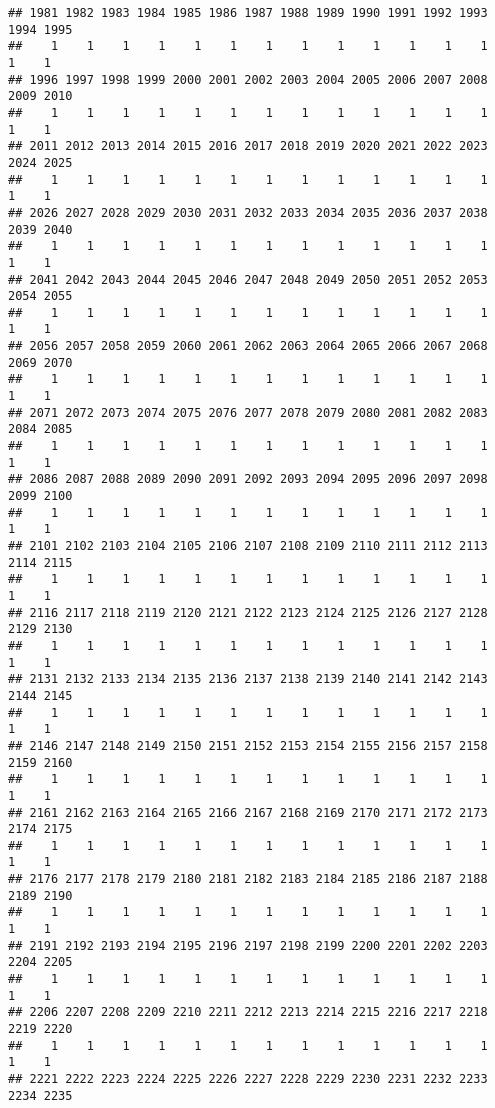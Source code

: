 \documentclass[]{article}
\begin{document}
\begin{verbatim}
## 1981 1982 1983 1984 1985 1986 1987 1988 1989 1990 1991 1992 1993 1994 1995 
##    1    1    1    1    1    1    1    1    1    1    1    1    1    1    1 
## 1996 1997 1998 1999 2000 2001 2002 2003 2004 2005 2006 2007 2008 2009 2010 
##    1    1    1    1    1    1    1    1    1    1    1    1    1    1    1 
## 2011 2012 2013 2014 2015 2016 2017 2018 2019 2020 2021 2022 2023 2024 2025 
##    1    1    1    1    1    1    1    1    1    1    1    1    1    1    1 
## 2026 2027 2028 2029 2030 2031 2032 2033 2034 2035 2036 2037 2038 2039 2040 
##    1    1    1    1    1    1    1    1    1    1    1    1    1    1    1 
## 2041 2042 2043 2044 2045 2046 2047 2048 2049 2050 2051 2052 2053 2054 2055 
##    1    1    1    1    1    1    1    1    1    1    1    1    1    1    1 
## 2056 2057 2058 2059 2060 2061 2062 2063 2064 2065 2066 2067 2068 2069 2070 
##    1    1    1    1    1    1    1    1    1    1    1    1    1    1    1 
## 2071 2072 2073 2074 2075 2076 2077 2078 2079 2080 2081 2082 2083 2084 2085 
##    1    1    1    1    1    1    1    1    1    1    1    1    1    1    1 
## 2086 2087 2088 2089 2090 2091 2092 2093 2094 2095 2096 2097 2098 2099 2100 
##    1    1    1    1    1    1    1    1    1    1    1    1    1    1    1 
## 2101 2102 2103 2104 2105 2106 2107 2108 2109 2110 2111 2112 2113 2114 2115 
##    1    1    1    1    1    1    1    1    1    1    1    1    1    1    1 
## 2116 2117 2118 2119 2120 2121 2122 2123 2124 2125 2126 2127 2128 2129 2130 
##    1    1    1    1    1    1    1    1    1    1    1    1    1    1    1 
## 2131 2132 2133 2134 2135 2136 2137 2138 2139 2140 2141 2142 2143 2144 2145 
##    1    1    1    1    1    1    1    1    1    1    1    1    1    1    1 
## 2146 2147 2148 2149 2150 2151 2152 2153 2154 2155 2156 2157 2158 2159 2160 
##    1    1    1    1    1    1    1    1    1    1    1    1    1    1    1 
## 2161 2162 2163 2164 2165 2166 2167 2168 2169 2170 2171 2172 2173 2174 2175 
##    1    1    1    1    1    1    1    1    1    1    1    1    1    1    1 
## 2176 2177 2178 2179 2180 2181 2182 2183 2184 2185 2186 2187 2188 2189 2190 
##    1    1    1    1    1    1    1    1    1    1    1    1    1    1    1 
## 2191 2192 2193 2194 2195 2196 2197 2198 2199 2200 2201 2202 2203 2204 2205 
##    1    1    1    1    1    1    1    1    1    1    1    1    1    1    1 
## 2206 2207 2208 2209 2210 2211 2212 2213 2214 2215 2216 2217 2218 2219 2220 
##    1    1    1    1    1    1    1    1    1    1    1    1    1    1    1 
## 2221 2222 2223 2224 2225 2226 2227 2228 2229 2230 2231 2232 2233 2234 2235 

\end{verbatim}
\end{document}
